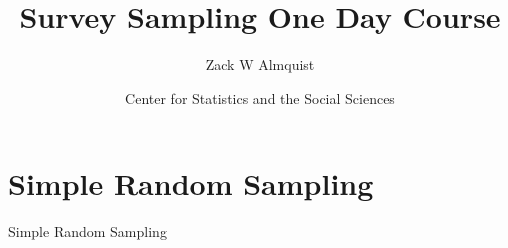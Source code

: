 \documentclass[10pt]{beamer}\usepackage[]{graphicx}\usepackage[]{xcolor}
\title[]{Survey Sampling One Day Course}
\author[Zack W Almquist]{Zack W Almquist\\}
\institute[Department of Sociology,\\ University of Washington]{
  Department of Sociology\\
  University of Washington}
\date{Center for Statistics and the Social Sciences}
\begin{document}
{
\begin{frame}[plain]
  \titlepage
\end{frame}
}

\section[Outline]{}
\begin{frame}{}
\vspace{.25in}
\hspace{.5in}\tableofcontents
\end{frame}




\section{Simple Random Sampling}
\begin{frame}{}
\begin{block}{}
\begin{center}
Simple Random Sampling
\end{center}
\end{block}
\end{frame}
\end{document}
